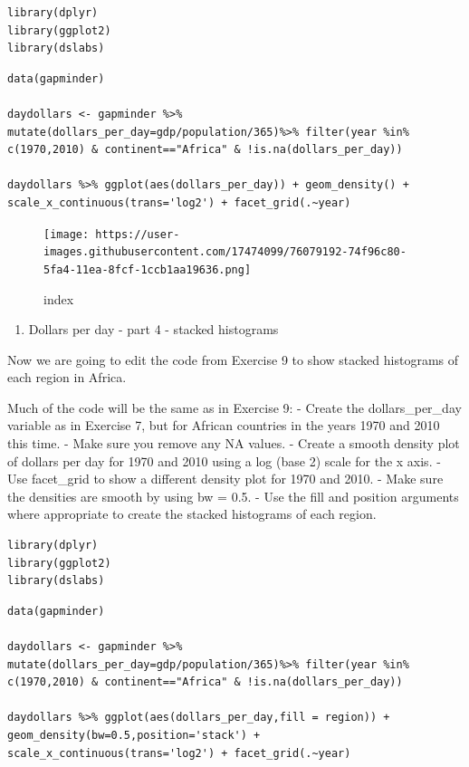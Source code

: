 \documentclass[
]{article}
\providecommand{\tightlist}{%
  \setlength{\itemsep}{0pt}\setlength{\parskip}{0pt}}
\begin{document}
\begin{verbatim}
library(dplyr)
library(ggplot2)
library(dslabs)
\end{verbatim}

\begin{verbatim}
data(gapminder)

daydollars <- gapminder %>% mutate(dollars_per_day=gdp/population/365)%>% filter(year %in% c(1970,2010) & continent=="Africa" & !is.na(dollars_per_day))

daydollars %>% ggplot(aes(dollars_per_day)) + geom_density() + scale_x_continuous(trans='log2') + facet_grid(.~year)
\end{verbatim}

\begin{figure}
\centering
\texttt{[image: https://user-images.githubusercontent.com/17474099/76079192-74f96c80-5fa4-11ea-8fcf-1ccb1aa19636.png]}
\caption{index}
\end{figure}

\begin{enumerate}
\def\labelenumi{\arabic{enumi}.}
\setcounter{enumi}{9}
\tightlist
\item
  Dollars per day - part 4 - stacked histograms
\end{enumerate}

Now we are going to edit the code from Exercise 9 to show stacked
histograms of each region in Africa.

Much of the code will be the same as in Exercise 9: - Create the
dollars\_per\_day variable as in Exercise 7, but for African countries
in the years 1970 and 2010 this time. - Make sure you remove any NA
values. - Create a smooth density plot of dollars per day for 1970 and
2010 using a log (base 2) scale for the x axis. - Use facet\_grid to
show a different density plot for 1970 and 2010. - Make sure the
densities are smooth by using bw = 0.5. - Use the fill and position
arguments where appropriate to create the stacked histograms of each
region.

\begin{verbatim}
library(dplyr)
library(ggplot2)
library(dslabs)
\end{verbatim}

\begin{verbatim}
data(gapminder)

daydollars <- gapminder %>% mutate(dollars_per_day=gdp/population/365)%>% filter(year %in% c(1970,2010) & continent=="Africa" & !is.na(dollars_per_day))

daydollars %>% ggplot(aes(dollars_per_day,fill = region)) + geom_density(bw=0.5,position='stack') + scale_x_continuous(trans='log2') + facet_grid(.~year)
\end{verbatim}
\end{document}
